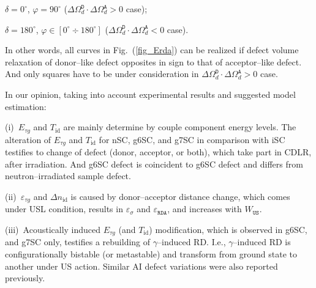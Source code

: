 \documentclass[aip,jap, amsmath,amssymb,reprint]{revtex4-1}
\begin{document}

\noindent  $\delta=0^\circ$, $\varphi=90^\circ$ ($\Delta\Omega_d^\mathtt{D}\cdot\Delta\Omega_d^\mathtt{A}>0$ case);

\noindent  $\delta=180^\circ$, $\varphi\in[0^\circ\div 180^\circ]$ ($\Delta\Omega_d^\mathtt{D}\cdot\Delta\Omega_d^\mathtt{A}<0$ case).

\noindent
In other words, all curves in Fig.~(\ref{fig_Erda}) can be realized if defect volume relaxation of donor--like defect opposites in sign to that of acceptor--like defect.
And only squares have to be under consideration in $\Delta\Omega_d^\mathtt{D}\cdot\Delta\Omega_d^\mathtt{A}>0$ case.

In our opinion, taking into account experimental results and suggested model estimation:

\noindent
(i)~$E_{\tau g}$ and $T_{\mathrm{id}}$ are mainly determine by couple component energy levels.
The alteration of $E_{\tau g}$ and $T_{\mathrm{id}}$ for nSC, g6SC, and g7SC in comparison with iSC testifies to change of defect (donor, acceptor, or both),
which take part in CDLR, after irradiation.
And g6SC defect is coincident to g6SC defect and differs from neutron--irradiated sample defect.

\noindent
(ii)~$\varepsilon_{\tau g}$ and  $\Delta n_{\mathrm{id}}$ is caused by donor--acceptor distance change, which
comes under USL condition,
results in $\varepsilon_{\sigma}$ and $\varepsilon_{\mathtt{RDA}}$,
and increases with $W_{\mathtt{US}}$.

\noindent
(iii)~Acoustically induced $E_{\tau g}$ (and $T_{\mathrm{id}}$) modification, which is observed in g6SC, and g7SC only,
testifies a rebuilding of  $\gamma$--induced RD.
I.e., $\gamma$--induced RD is conﬁgurationally bistable (or metastable) and transform from ground state to another under US action.
Similar AI defect variations were also reported previously\cite{Wosinski,Ostapenko1994,Olikh2009Sem,YOlikhTPL2011}.
\end{document}
